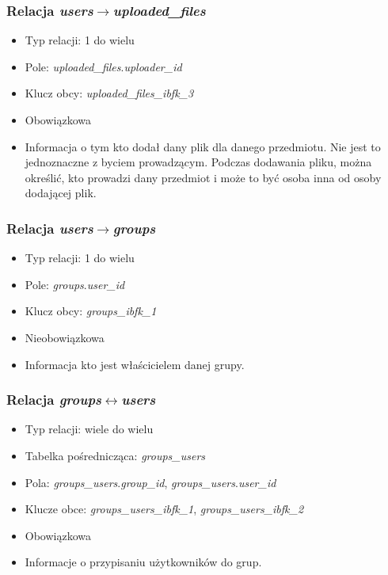 \documentclass[a4paper,12pt,oneside]{report}
\begin{document}
\subsubsection{Relacja \emph{users}$\to$\emph{uploaded\_files}}
\label{subsub:users-uploaded_files}
\begin{itemize}
  \item Typ relacji: 1 do wielu
  \item Pole: \emph{uploaded\_files}.\emph{uploader\_id}
  \item Klucz obcy: \emph{uploaded\_files\_ibfk\_3}
  \item Obowiązkowa
  \item Informacja o tym kto dodał dany plik dla danego przedmiotu. Nie jest to jednoznaczne z byciem prowadzącym. Podczas dodawania pliku, można określić, kto prowadzi dany przedmiot i może to być osoba inna od osoby dodającej plik.
\end{itemize}

\subsubsection{Relacja \emph{users}$\to$\emph{groups}}
\label{subsub:users-groups}
\begin{itemize}
  \item Typ relacji: 1 do wielu
  \item Pole: \emph{groups}.\emph{user\_id}
  \item Klucz obcy: \emph{groups\_ibfk\_1}
  \item Nieobowiązkowa
  \item Informacja kto jest właścicielem danej grupy.
\end{itemize}

\subsubsection{Relacja \emph{groups}$\leftrightarrow$\emph{users}}
\label{subsub:groups-users}
\begin{itemize}
  \item Typ relacji: wiele do wielu
  \item Tabelka pośrednicząca: \emph{groups\_users}
  \item Pola: \emph{groups\_users}.\emph{group\_id}, \emph{groups\_users}.\emph{user\_id}
  \item Klucze obce: \emph{groups\_users\_ibfk\_1}, \emph{groups\_users\_ibfk\_2}
  \item Obowiązkowa
  \item Informacje o przypisaniu użytkowników do grup.
\end{itemize}
\end{document}
